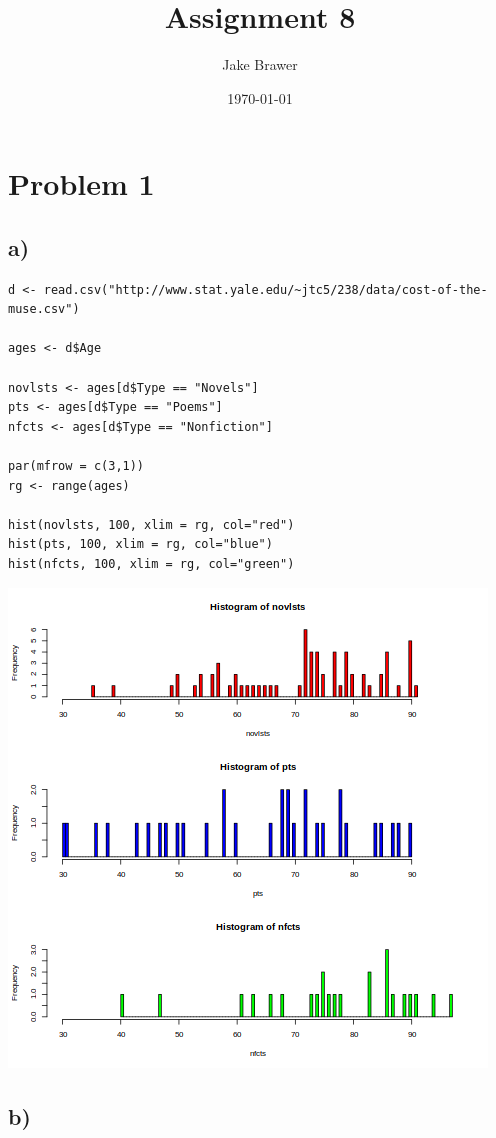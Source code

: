 \documentclass[11pt]{article}
\author{Jake Brawer}
\date{\today}
\title{Assignment 8}
\begin{document}
\maketitle

\section*{Problem 1}
\label{sec:orgdb731c4}
\subsection*{a)}
\label{sec:org10c2986}
\begin{verbatim}
d <- read.csv("http://www.stat.yale.edu/~jtc5/238/data/cost-of-the-muse.csv")

ages <- d$Age

novlsts <- ages[d$Type == "Novels"]
pts <- ages[d$Type == "Poems"]
nfcts <- ages[d$Type == "Nonfiction"]

par(mfrow = c(3,1))
rg <- range(ages)

hist(novlsts, 100, xlim = rg, col="red")
hist(pts, 100, xlim = rg, col="blue")
hist(nfcts, 100, xlim = rg, col="green")
\end{verbatim}

\begin{center}
\includegraphics[width=.9\linewidth]{hist.png}
\end{center}

\subsection*{b)}
\label{sec:orgb7a4077}
\end{document}
